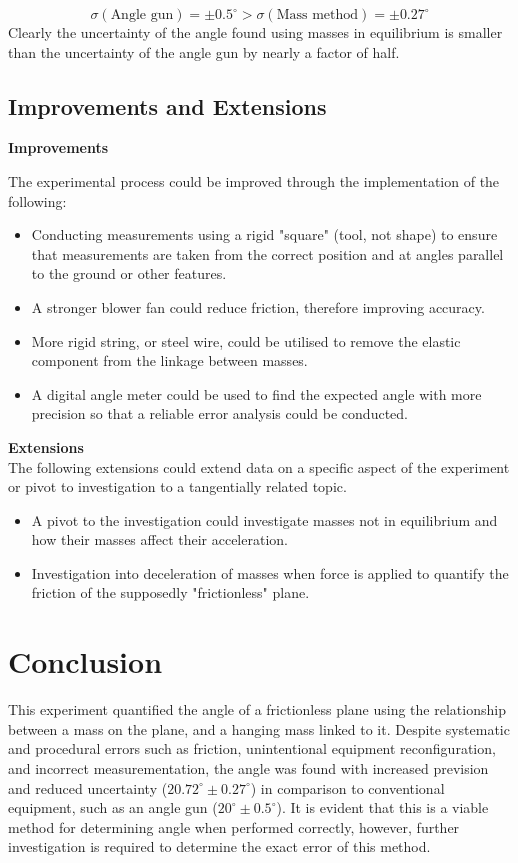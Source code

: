 \documentclass[11pt,a4paper]{article}
\begin{document}
$$\sigma(\textrm{Angle gun})=\pm0.5^\circ>\sigma(\textrm{Mass method})=\pm{0.27^\circ}$$
Clearly the uncertainty of the angle found using masses in equilibrium is smaller than the uncertainty of the angle gun by nearly a factor of half.

\subsection{Improvements and Extensions}

	{\large
	\textbf{Improvements}\\}

	The experimental process could be improved through the implementation of the following:
\begin{itemize}
	\item Conducting measurements using a rigid "square" (tool, not shape) to ensure that measurements are taken from the correct position and at angles parallel to the ground or other features. 
	\item A stronger blower fan could reduce friction, therefore improving accuracy. 
	\item More rigid string, or steel wire, could be utilised to remove the elastic component from the linkage between masses.
	\item A digital angle meter could be used to find the expected angle with more precision so that a reliable error analysis could be conducted.
\end{itemize}

	{\large
	\textbf{Extensions}}\\
The following extensions could extend data on a specific aspect of the experiment or pivot to investigation to a tangentially related topic.
\begin{itemize}
	\item A pivot to the investigation could investigate masses not in equilibrium and how their masses affect their acceleration. 
	\item Investigation into deceleration of masses when force is applied to quantify the friction of the supposedly "frictionless" plane.
	
\end{itemize}

\section{Conclusion}
This experiment quantified the angle of a frictionless plane using the relationship between a mass on the plane, and a hanging mass linked to it. Despite systematic and procedural errors such as friction, unintentional equipment reconfiguration, and incorrect measurementation, the angle was found with increased prevision and reduced uncertainty ($20.72^\circ \pm 0.27^\circ$) in comparison to conventional equipment, such as an angle gun ($20^\circ \pm 0.5^\circ$). It is evident that this is a viable method for determining angle when performed correctly, however, further investigation is required to determine the exact error of this method.



\newpage



	
\end{document}
